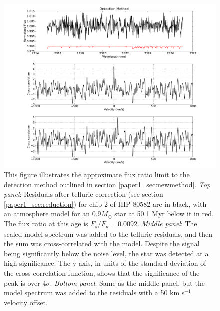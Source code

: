\begin{figure}[t]
  \centering
  \includegraphics[width=\columnwidth]{Figures/paper1_fig1.pdf}
  \caption{This figure illustrates the approximate flux ratio limit to
  the detection method outlined in section
  \ref{paper1_sec:newmethod}. \emph{Top panel}: Residuals after telluric
  correction (see section \ref{paper1_sec:reduction}) for chip 2 of HIP 80582 are in black, with an
  atmosphere model for an $0.9 M_{\odot}$ star at 50.1 Myr below it in
  red. The flux ratio at this age is $F_s/F_p = 0.0092$. \emph{Middle panel}: The scaled model
  spectrum was added to the telluric residuals, and then the sum was
  cross-correlated with the model. Despite the signal being
  significantly below the noise level, the star was detected at a high
significance. The y axis, in units of the standard deviation of the
cross-correlation function, shows that the significance of the peak is over
$4\sigma$. \emph{Bottom panel}: Same as the middle panel, but the
model spectrum was added to the residuals with a 50 km s$^{-1}$ velocity
offset.}
  \label{paper1_fig:method}
\end{figure}

